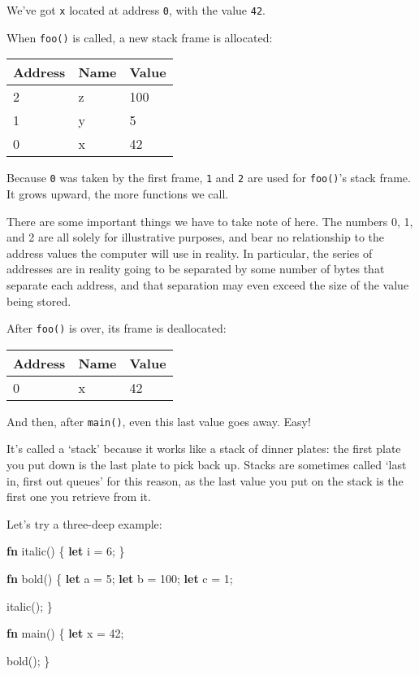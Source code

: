 \documentclass[a4paper,]{book}
\newenvironment{Shaded}{\begin{snugshade}}{\end{snugshade}}
\newcommand{\KeywordTok}[1]{\textcolor[rgb]{0.13,0.29,0.53}{\textbf{{#1}}}}
\newcommand{\DecValTok}[1]{\textcolor[rgb]{0.00,0.00,0.81}{{#1}}}
\newcommand{\NormalTok}[1]{{#1}}
\begin{document}
We've got \texttt{x} located at address \texttt{0}, with the value
\texttt{42}.

When \texttt{foo()} is called, a new stack frame is allocated:

\begin{longtable}[]{@{}lll@{}}
\toprule
Address & Name & Value\tabularnewline
\midrule
\endhead
2 & z & 100\tabularnewline
1 & y & 5\tabularnewline
0 & x & 42\tabularnewline
\bottomrule
\end{longtable}

Because \texttt{0} was taken by the first frame, \texttt{1} and
\texttt{2} are used for \texttt{foo()}'s stack frame. It grows upward,
the more functions we call.

There are some important things we have to take note of here. The
numbers 0, 1, and 2 are all solely for illustrative purposes, and bear
no relationship to the address values the computer will use in reality.
In particular, the series of addresses are in reality going to be
separated by some number of bytes that separate each address, and that
separation may even exceed the size of the value being stored.

After \texttt{foo()} is over, its frame is deallocated:

\begin{longtable}[]{@{}lll@{}}
\toprule
Address & Name & Value\tabularnewline
\midrule
\endhead
0 & x & 42\tabularnewline
\bottomrule
\end{longtable}

And then, after \texttt{main()}, even this last value goes away. Easy!

It's called a `stack' because it works like a stack of dinner plates:
the first plate you put down is the last plate to pick back up. Stacks
are sometimes called `last in, first out queues' for this reason, as the
last value you put on the stack is the first one you retrieve from it.

Let's try a three-deep example:

\begin{Shaded}
\begin{Highlighting}[]
\KeywordTok{fn} \NormalTok{italic() \{}
    \KeywordTok{let} \NormalTok{i = }\DecValTok{6}\NormalTok{;}
\NormalTok{\}}

\KeywordTok{fn} \NormalTok{bold() \{}
    \KeywordTok{let} \NormalTok{a = }\DecValTok{5}\NormalTok{;}
    \KeywordTok{let} \NormalTok{b = }\DecValTok{100}\NormalTok{;}
    \KeywordTok{let} \NormalTok{c = }\DecValTok{1}\NormalTok{;}

    \NormalTok{italic();}
\NormalTok{\}}

\KeywordTok{fn} \NormalTok{main() \{}
    \KeywordTok{let} \NormalTok{x = }\DecValTok{42}\NormalTok{;}

    \NormalTok{bold();}
\NormalTok{\}}
\end{Highlighting}
\end{Shaded}
\end{document}
